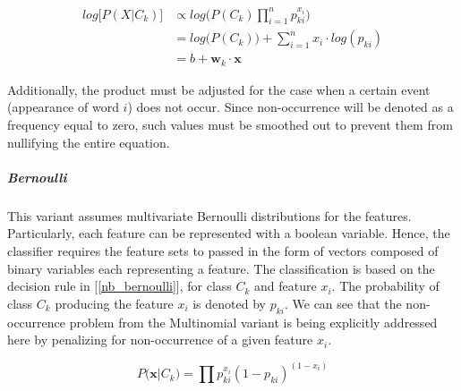 	\begin{equation}
		\begin{aligned}
			log \big[ P(X|C_k) \big] &\propto log \bigg( P(C_k)\prod_{i=1}^n p_{ki}^{x_i} \bigg) \\
			&= log \bigg(P(C_k) \bigg) + \sum_{i=1}^n x_i \cdot log(p_{ki}) \\
			&= b + \textbf{w}_k \cdot \textbf{x} 
		\end{aligned}
		\label{nb_multinom_log}
	\end{equation}
		
		Additionally, the product must be adjusted for the case when a certain event (appearance of word $ i $) does not occur. Since non-occurrence will be denoted as a frequency equal to zero, such values must be smoothed out to prevent them from nullifying the entire equation.
	
	\subparagraph{Bernoulli}
		This variant assumes multivariate Bernoulli distributions for the features. Particularly, each feature can be represented with a boolean variable. Hence, the classifier requires the feature sets to passed in the form of vectors composed of binary variables each representing a feature. The classification is based on the decision rule in [\ref{nb_bernoulli}], for class $ C_k $ and feature $ x_i $. The probability of class $ C_k $ producing the feature $ x_i $ is denoted by $ p_{ki} $. We can see that the non-occurrence problem from the Multinomial variant is being explicitly addressed here by penalizing for non-occurrence of a given feature $ x_i $.
	
	\begin{equation}
		P \big(\textbf{x}|C_k \big) = \prod p_{ki}^{x_i}(1-p_{ki})^{(1-x_i)}
		\label{nb_bernoulli}
	\end{equation}